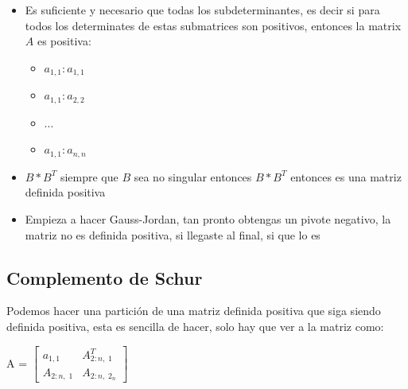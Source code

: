 \documentclass[12pt, fleqn]{report}                             %
\newenvironment{SmallIndentation}[1][0.75em]                    %
        {\begin{adjustwidth}{#1}{}\begin{footnotesize}}             %
        {\end{footnotesize}\end{adjustwidth}}                       %
\def \Eq {equation}                                             %
\newenvironment{MultiLineEquation*}[1]                          %
        {\begin{\Eq*}\begin{alignedat}{#1}}                         %
        {\end{alignedat}\end{\Eq*}}                                 %
\newenvironment{LargeEq} {\begingroup \Large}{\endgroup}        %
\theoremstyle{break}                                            %
\newcommand{\bVector}[1]                                        %
        { \ensuremath{\begin{bmatrix}#1\end{bmatrix}} }             %
\newcommand{\Color}[2]{\textcolor{#1}{#2}}                      %
\newcommand \ColorMatrixA       {Teal700MD}                     %
\newcommand \MatrixA      {\Color{\ColorMatrixA}{A}}            %
\begin{document}
\begin{itemize}
\begin{SmallIndentation}[1em]
                            Contradicción.

                        \end{SmallIndentation}

                    \item
                        Es suficiente y necesario que todas los subdeterminantes, es decir si para todos los
                        determinates de estas submatrices son positivos, entonces la matrix $A$ es positiva:
                        \begin{itemize} 
                            \item $a_{1, 1}:a_{1,1}$
                            \item $a_{1, 1}:a_{2,2}$
                            \item $\dots$
                            \item $a_{1, 1}:a_{n,n}$
                        \end{itemize}

                    \item $B * B^T$ siempre que $B$ sea no singular entonces $B * B^T$ entonces es una matriz definida
                        positiva

                    \item Empieza a hacer Gauss-Jordan, tan pronto obtengas un pivote negativo,
                        la matriz no es definida positiva, si llegaste al final, si que lo es
                \end{itemize}
            

            \clearpage
            \subsection{Complemento de Schur}

                Podemos hacer una partición de una matriz definida positiva
                que siga siendo definida positiva, esta es sencilla de hacer,
                solo hay que ver a la matriz como:
                \begin{LargeEq}
                    \begin{MultiLineEquation*}{3}
                        \MatrixA
                            = \bVector{
                                a_{1, 1}       & A_{2:n, \; 1}^T  \\
                                A_{2:n, \; 1}  & A_{2:n, \;2_n} 
                            }
                    \end{MultiLineEquation*}
                \end{LargeEq}
\end{document}
